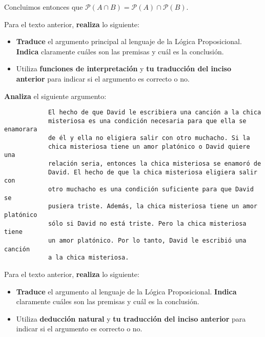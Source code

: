 \documentclass[oneside]{style}
\begin{document}
\begin{questions}[label=\protect\circled{\bfseries\arabic*}]
{        Concluimos entonces que $\mathcal{P}(A \cap B) = \mathcal{P}(A) \cap 
        \mathcal{P}(B)$. 

        \vspace{5mm}

        Para el texto anterior, \textbf{realiza} lo siguiente:
        \begin{itemize}
            \item \textbf{Traduce} el argumento principal al lenguaje de la Lógica 
            Proposicional. \textbf{Indica} claramente cuáles son las premisas y
            cuál es la conclusión. 
            
            \item Utiliza \textbf{funciones de interpretación} y \textbf{tu 
            traducción del inciso anterior} para indicar si el argumento es 
            correcto o no. 
        \end{itemize}
    
    }

    \question
    {
        \textbf{Analiza} el siguiente argumento:
        \begin{verbatim}
            El hecho de que David le escribiera una canción a la chica 
            misteriosa es una condición necesaria para que ella se enamorara 
            de él y ella no eligiera salir con otro muchacho. Si la 
            chica misteriosa tiene un amor platónico o David quiere una 
            relación seria, entonces la chica misteriosa se enamoró de 
            David. El hecho de que la chica misteriosa eligiera salir con 
            otro muchacho es una condición suficiente para que David se 
            pusiera triste. Además, la chica misteriosa tiene un amor platónico
            sólo si David no está triste. Pero la chica misteriosa tiene 
            un amor platónico. Por lo tanto, David le escribió una canción 
            a la chica misteriosa. 
        \end{verbatim}

        Para el texto anterior, \textbf{realiza} lo siguiente:
        \begin{itemize}
            \item \textbf{Traduce} el argumento al lenguaje de la Lógica 
            Proposicional. \textbf{Indica} claramente cuáles son las premisas y
            cuál es la conclusión. 
            
            \item Utiliza \textbf{deducción natural} y \textbf{tu 
            traducción del inciso anterior} para indicar si el argumento es 
            correcto o no. 
        \end{itemize}

}
\end{questions}
\end{document}
